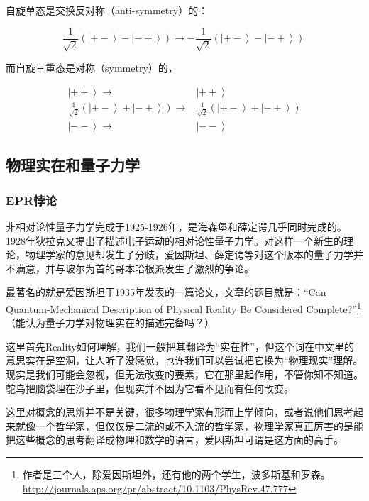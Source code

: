 自旋单态是交换反对称（anti-symmetry）的：

\begin{equation}
\frac{1}{\sqrt{2}} \left( \left|+- \right\rangle - \left|-+ \right\rangle  \right) \to - \frac{1}{\sqrt{2}} \left( \left|+- \right\rangle - \left|-+ \right\rangle  \right) ~
\end{equation}

而自旋三重态是对称（symmetry）的，

\begin{align}
\left|  ++ \right\rangle   \to & \left|  ++ \right\rangle  \\
\frac{1}{\sqrt{2}} \left( \left|+- \right\rangle + \left|-+ \right\rangle  \right) \to& \frac{1}{\sqrt{2}} \left( \left|+- \right\rangle + \left|-+ \right\rangle  \right) \\
\left|  -- \right\rangle  \to & \left|  -- \right\rangle~
\end{align}


\subsection{物理实在和量子力学}

\subsubsection{EPR悖论}

非相对论性量子力学完成于1925-1926年，是海森堡和薛定谔几乎同时完成的。1928年狄拉克又提出了描述电子运动的相对论性量子力学。对这样一个新生的理论，物理学家的意见却发生了分歧，爱因斯坦、薛定谔等对这个版本的量子力学并不满意，并与玻尔为首的哥本哈根派发生了激烈的争论。

最著名的就是爱因斯坦于1935年发表的一篇论文，文章的题目就是：“Can Quantum-Mechanical Description of Physical Reality Be Considered Complete?”\footnote{作者是三个人，除爱因斯坦外，还有他的两个学生，波多斯基和罗森。\url{http://journals.aps.org/pr/abstract/10.1103/PhysRev.47.777}}（能认为量子力学对物理实在的描述完备吗？）

这里首先Reality如何理解，我们一般把其翻译为“实在性”，但这个词在中文里的意思实在是空洞，让人听了没感觉，也许我们可以尝试把它换为“物理现实”理解。现实是我们可能会忽视，但无法改变的要素，它在那里起作用，不管你知不知道。鸵鸟把脑袋埋在沙子里，但现实并不因为它看不见而有任何改变。

这里对概念的思辨并不是关键，很多物理学家有形而上学倾向，或者说他们思考起来就像一个哲学家，但仅仅是二流的或不入流的哲学家，物理学家真正厉害的是能把这些概念的思考翻译成物理和数学的语言，爱因斯坦可谓是这方面的高手。

